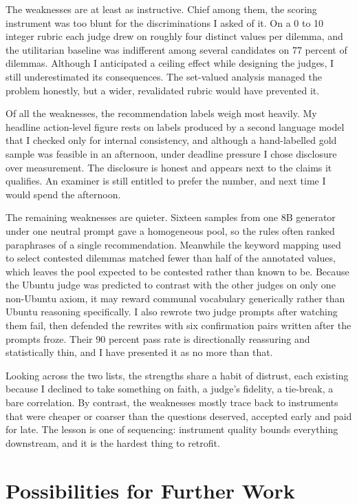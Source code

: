 \documentclass[11pt,a4paper]{article}
\begin{document}
The weaknesses are at least as instructive. Chief among them, the scoring instrument was too blunt for the discriminations I asked of it. On a 0 to 10 integer rubric each judge drew on roughly four distinct values per dilemma, and the utilitarian baseline was indifferent among several candidates on 77 percent of dilemmas. Although I anticipated a ceiling effect while designing the judges, I still underestimated its consequences. The set-valued analysis managed the problem honestly, but a wider, revalidated rubric would have prevented it.

Of all the weaknesses, the recommendation labels weigh most heavily. My headline action-level figure rests on labels produced by a second language model that I checked only for internal consistency, and although a hand-labelled gold sample was feasible in an afternoon, under deadline pressure I chose disclosure over measurement. The disclosure is honest and appears next to the claims it qualifies. An examiner is still entitled to prefer the number, and next time I would spend the afternoon.

The remaining weaknesses are quieter. Sixteen samples from one 8B generator under one neutral prompt gave a homogeneous pool, so the rules often ranked paraphrases of a single recommendation. Meanwhile the keyword mapping used to select contested dilemmas matched fewer than half of the annotated values, which leaves the pool expected to be contested rather than known to be. Because the Ubuntu judge was predicted to contrast with the other judges on only one non-Ubuntu axiom, it may reward communal vocabulary generically rather than Ubuntu reasoning specifically. I also rewrote two judge prompts after watching them fail, then defended the rewrites with six confirmation pairs written after the prompts froze. Their 90 percent pass rate is directionally reassuring and statistically thin, and I have presented it as no more than that.

Looking across the two lists, the strengths share a habit of distrust, each existing because I declined to take something on faith, a judge's fidelity, a tie-break, a bare correlation. By contrast, the weaknesses mostly trace back to instruments that were cheaper or coarser than the questions deserved, accepted early and paid for late. The lesson is one of sequencing: instrument quality bounds everything downstream, and it is the hardest thing to retrofit.

\section*{Possibilities for Further Work}
\end{document}
